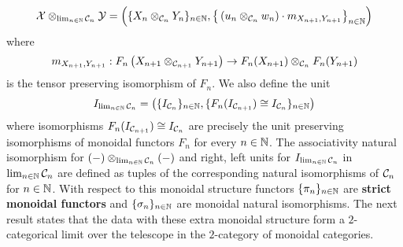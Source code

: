 $${\mathcal X} \otimes_{\lim_{n\in {\mathbb N}}{\mathcal C}_n} {\mathcal Y} = \left(\{X_n\otimes_{{\mathcal C}_n}Y_n\}_{n\in {\mathbb N}},\big\{\left(u_n \otimes_{{\mathcal C}_n} w_n\right)\cdot m_{X_{n+1},Y_{n+1}}\big\}_{n\in {\mathbb N}}\right)$$
where
$$m_{X_{n+1},Y_{n+1}}:F_{n}\left(X_{n+1}\otimes_{{\mathcal C}_{n+1}} Y_{n+1}\right) \rightarrow F_{n}(X_{n+1})\otimes_{{\mathcal C}_n}F_{n}(Y_{n+1})$$
is the tensor preserving isomorphism of $F_{n}$. We also define the unit
$$I_{\lim_{n\in {\mathbb N}}{\mathcal C}_n} = \left(\{I_{{\mathcal C}_n}\}_{n\in {\mathbb N}}, \{F_{n}(I_{{\mathcal C}_{n+1}})\cong I_{{\mathcal C}_n}\}_{n\in {\mathbb N}}\right)$$
where isomorphisms $F_{n}(I_{{\mathcal C}_{n+1}})\cong I_{{\mathcal C}_n}$ are precisely the unit preserving isomorphisms of monoidal functors $F_{n}$ for every $n\in {\mathbb N}$. The associativity natural isomorphism for $(-)\otimes_{\lim_{n\in {\mathbb N}}{\mathcal C}_n}(-)$ and right, left units for $I_{\lim_{n\in {\mathbb N}}{\mathcal C}_n}$ in $\lim_{n\in {\mathbb N}}{\mathcal C}_n$ are defined as tuples of the corresponding natural isomorphisms of ${\mathcal C}_n$ for $n\in {\mathbb N}$. With respect to this monoidal structure functors $\{\pi_n\}_{n\in {\mathbb N}}$ are \textbf{strict monoidal functors} and $\{\sigma_n\}_{n\in {\mathbb N}}$ are monoidal natural isomorphisms. The next result states that the data with these extra monoidal structure form a $2$-categorical limit over the telescope in the $2$-category of monoidal categories.

